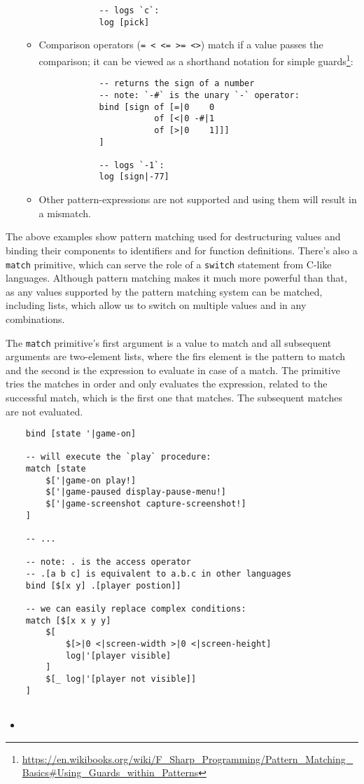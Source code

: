 \begin{itemize}
\begin{itemize}
\begin{lstlisting}
            -- logs `c`:
            log [pick]
        \end{lstlisting}
        \item Comparison operators (\texttt{= < <= >= <>}) match if a value passes the comparison; it can be viewed as a shorthand notation for simple guards\footnote{\url{https://en.wikibooks.org/wiki/F_Sharp_Programming/Pattern_Matching_Basics\#Using_Guards_within_Patterns}}:
        \begin{lstlisting}
            -- returns the sign of a number
            -- note: `-#` is the unary `-` operator:
            bind [sign of [=|0    0
                       of [<|0 -#|1
                       of [>|0    1]]]
            ]
            
            -- logs `-1`:
            log [sign|-77]
        \end{lstlisting}
        \item Other pattern-expressions are not supported and using them will result in a mismatch.
    \end{itemize}
\end{itemize}

The above examples show pattern matching used for destructuring values and binding their components to identifiers and for function definitions. There's also a \texttt{match} primitive, which can serve the role of a \texttt{switch} statement from C-like languages. Although pattern matching makes it much more powerful than that, as any values supported by the pattern matching system can be matched, including lists, which allow us to switch on multiple values and in any combinations.

The \texttt{match} primitive's first argument is a value to match and all subsequent arguments are two-element lists, where the firs element is the pattern to match and the second is the expression to evaluate in case of a match. The primitive tries the matches in order and only evaluates the expression, related to the successful match, which is the first one that matches. The subsequent matches are not evaluated.

\begin{lstlisting}
    bind [state '|game-on]
    
    -- will execute the `play` procedure:
    match [state
        $['|game-on play!]
        $['|game-paused display-pause-menu!]
        $['|game-screenshot capture-screenshot!]
    ]
    
    -- ...

    -- note: . is the access operator
    -- .[a b c] is equivalent to a.b.c in other languages
    bind [$[x y] .[player postion]]
    
    -- we can easily replace complex conditions:
    match [$[x x y y]
        $[
            $[>|0 <|screen-width >|0 <|screen-height]
            log|'[player visible]
        ]
        $[_ log|'[player not visible]]
    ]
    
\end{lstlisting}
\begin{itemize}
    \item 
\end{itemize}

